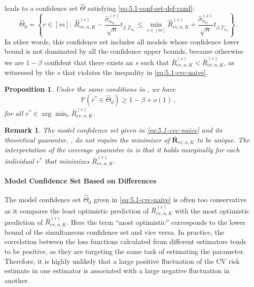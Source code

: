 \documentclass[11pt]{article}
\theoremstyle{plain}
\newtheorem{proposition}[theorem]{Proposition}
\newtheorem{remark}[theorem]{Remark}
\newcommand{\cv}{{\mathrm{cv}}}
\newcommand{\tr}{{\mathrm{tr}}}
\begin{document}
 leads to a confidence set $\hat\Theta$ satisfying \eqref{eq:5.1-conf-set-def-rand}:
\begin{equation}\label{eq:5.1-cvc-naive}
\hat\Theta_0=\left\{r\in[m]:~\hat R_{\cv,n,K}^{(r)}-\frac{\hat\sigma_{n_\tr}^{(r)}}{\sqrt{n}}t_{\beta,\hat\Gamma_{n_\tr}}\le \min_{s\in[m]}\hat R_{\cv,n,K}^{(s)}+\frac{\hat\sigma_{n_\tr}^{(s)}}{\sqrt{n}}t_{\beta,\hat\Gamma_{n_\tr}}\right\}\,.
\end{equation}
In other words, this confidence set includes all models whose confidence lower bound is not dominated by all the confidence upper bounds, because otherwise we are $1-\beta$ confident that there exists an $s$ such that $\bar R_{\cv,n,K}^{(s)}<\bar R_{\cv,n,K}^{(r)}$, as witnessed by the $s$ that violates the inequality in \eqref{eq:5.1-cvc-naive}. 
\begin{proposition}
    \label{pro:5.1-coverage-cvc-naive}
    Under the same conditions in , we have
    $$\mathbb P\left(r^*\in\hat\Theta_0\right)\ge 1-\beta+o(1)\,,$$
    for all $r^*\in \arg\min_r \bar R_{\cv,n,K}^{(r)}$.
\end{proposition}
\begin{remark}
    \label{rem:5.1-non-uniqueness}
    The model confidence set given in \eqref{eq:5.1-cvc-naive} and its theoretical guarantee, , do not require the minimizer of $\bar {\mathbf R}_{\cv,n,K}$ to be unique.  The interpretation of the coverage guarantee in  is that it holds marginally for each individual $r^*$ that minimizes $\bar R_{\cv,n,K}^{(r)}$.
\end{remark}

\paragraph{Model Confidence Set Based on Differences}
The model confidence set $\hat\Theta_0$ given in \eqref{eq:5.1-cvc-naive} is often too conservative as it compares the least optimistic prediction of $\bar R_{\cv,n,K}^{(s)}$ with the most optimistic prediction of $\bar R_{\cv,n,K}^{(r)}$. Here the term ``most optimistic'' corresponds to the lower bound of the simultaneous confidence set and vice versa.  In practice, the correlation between the loss functions calculated from different estimators tends to be positive, as they are targeting the same task of estimating the parameter. Therefore, it is highly unlikely that a large positive fluctuation of the CV risk estimate in one estimator is associated with a large negative fluctuation in another. 
\end{document}
